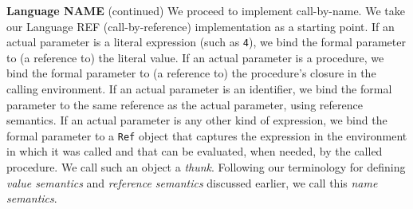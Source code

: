 \begin{minipage}[t]{\sw}
\slidenumber
\LARGE
{\bf Language NAME} (continued)\exx
We proceed to implement call-by-name.
We take our Language REF (call-by-reference)
implementation as a starting point.\exx
If an actual parameter is a literal expression (such as \verb'4'),
we bind the formal parameter to (a reference to) the literal value.
If an actual parameter is a procedure,
we bind the formal parameter
to (a reference to) the procedure's closure in the calling environment.
If an actual parameter is an identifier,
we bind the formal parameter
to the same reference as the actual parameter,
using reference semantics.\exx
If an actual parameter is any other kind of expression,
we bind the formal parameter
to a \verb'Ref' object that captures the expression
in the environment in which it was called
and that can be evaluated, when needed, by the called procedure.
We call such an object a {\em thunk}.\exx
Following our terminology
for defining {\em value semantics} and {\em reference semantics}
discussed earlier, we call this {\em name semantics}.
\end{minipage}
\clearpage
